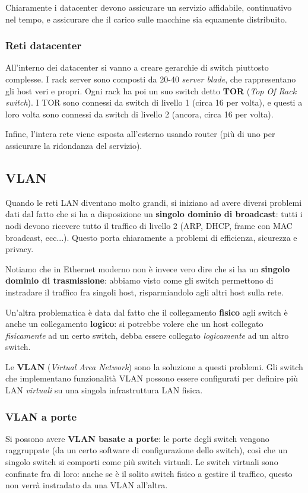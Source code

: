 \documentclass[a4paper,11pt]{article}
\begin{document}
Chiaramente i datacenter devono assicurare un servizio affidabile, continuativo nel tempo, e assicurare che il carico sulle macchine sia equamente distribuito.

\subsubsection{Reti datacenter}
All'interno dei datacenter si vanno a creare gerarchie di switch piuttosto complesse.
I rack server sono composti da 20-40 \textit{server blade}, che rappresentano gli host veri e propri.
Ogni rack ha poi un suo switch detto \textbf{TOR} (\textit{Top Of Rack switch}).
I TOR sono connessi da switch di livello 1 (circa 16 per volta), e questi a loro volta sono connessi da switch di livello 2 (ancora, circa 16 per volta).

Infine, l'intera rete viene esposta all'esterno usando router (più di uno per assicurare la ridondanza del servizio).

\subsection{VLAN}
Quando le reti LAN diventano molto grandi, si iniziano ad avere diversi problemi dati dal fatto che si ha a disposizione un \textbf{singolo dominio di broadcast}: tutti i nodi devono ricevere tutto il traffico di livello 2 (ARP, DHCP, frame con MAC broadcast, ecc...).
Questo porta chiaramente a problemi di efficienza, sicurezza e privacy.

Notiamo che in Ethernet moderno non è invece vero dire che si ha un \textbf{singolo dominio di trasmissione}: abbiamo visto come gli switch permettono di instradare il traffico fra singoli host, risparmiandolo agli altri host sulla rete. 

Un'altra problematica è data dal fatto che il collegamento \textbf{fisico} agli switch è anche un collegamento \textbf{logico}: si potrebbe volere che un host collegato \textit{fisicamente} ad un certo switch, debba essere collegato \textit{logicamente} ad un altro switch. 

Le \textbf{VLAN} (\textit{Virtual Area Network}) sono la soluzione a questi problemi.
Gli switch che implementano funzionalità VLAN possono essere configurati per definire più LAN \textit{virtuali} su una singola infrastruttura LAN fisica.

\subsubsection{VLAN a porte}
Si possono avere \textbf{VLAN basate a porte}: le porte degli switch vengono raggruppate (da un certo software di configurazione dello switch), così che un singolo switch si comporti come più switch virtuali.
Le switch virtuali sono confinate fra di loro: anche se è il solito switch fisico a gestire il traffico, questo non verrà instradato da una VLAN all'altra.
\end{document}

